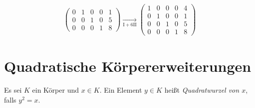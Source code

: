 \begin{bsp}
\begin{enumerate}[leftmargin=*]
\begin{align*}
\begin{pmatrix}
     0 & 1 & 0 & 0 & 1 \\
     0 & 0 & 1 & 0 & 5 \\
     0 & 0 & 0 & 1 & 8
    \end{pmatrix}
    \xrightarrow[\mathrm{I}+6\mathrm{II}]{}
    \begin{pmatrix}
     1 & 0 & 0 & 0 & 4 \\
     0 & 1 & 0 & 0 & 1 \\
     0 & 0 & 1 & 0 & 5 \\
     0 & 0 & 0 & 1 & 8
    \end{pmatrix}
   \end{align*}  
 \end{enumerate}
\end{bsp}
 




\section{Quadratische Körpererweiterungen}
\begin{defi}
 Es sei $K$ ein Körper und $x \in K$. Ein Element $y \in K$ heißt \emph{Quadratwurzel von $x$}, falls $y^2 = x$.
\end{defi}


